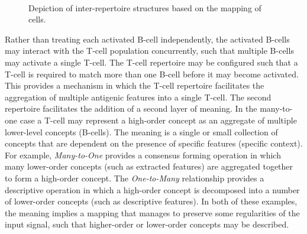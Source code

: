 \begin{figure}[htp]
{\begin{minipage}[t]{0.50\textwidth}
	\end{minipage}}\\
	\caption{Depiction of inter-repertoire structures based on the mapping of cells.}
	\label{fig:cells:mediated:structures} %
\end{figure}

Rather than treating each activated B-cell independently, the activated B-cells may interact with the T-cell population concurrently, such that multiple B-cells may activate a single T-cell. The T-cell repertoire may be configured such that a T-cell is required to match more than one B-cell before it may become activated. This provides a mechanism in which the T-cell repertoire facilitates the aggregation of multiple antigenic features into a single T-cell. The second repertoire facilitates the addition of a second layer of meaning. In the many-to-one case a T-cell may represent a high-order concept as an aggregate of multiple lower-level concepts (B-cells). The meaning is a single or small collection of concepts that are dependent on the presence of specific features (specific context). 
For example, \emph{Many-to-One} provides a consensus forming operation in which many lower-order concepts (such as extracted features) are aggregated together to form a high-order concept. The \emph{One-to-Many} relationship provides a descriptive operation in which a high-order concept is decomposed into a number of lower-order concepts (such as descriptive features). In both of these examples, the meaning implies a mapping that manages to preserve some regularities of the input signal, such that higher-order or lower-order concepts may be described. 

%
% 
